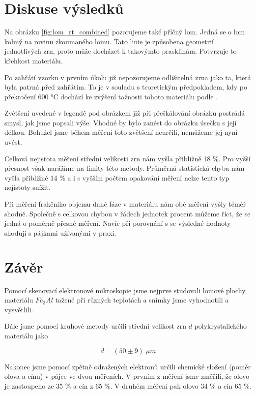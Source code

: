 \section{Diskuse výsledků}
Na obrázku \ref{fig:lom_rt_combined} pozorujeme také příčný lom. Jedná se o lom kolmý na rovinu zkoumaného lomu. Tato linie je způsobena geometrií jednotlivých zrn, proto může docházet k takovýmto prasklinám. Potvrzuje to křehkost materiálu.

Po zahřátí vzorku v prvním úkolu již nepozorujeme odlišitelná zrna jako ta, která byla patrná před zahřátím. To je v souladu s teoretickým předpokladem, kdy po překročení 600 °C dochází ke zvýšení tažnosti tohoto materiálu podle \cite{bib:studijni-text}.

Zvětšení uvedené v legendě pod obrázkem již při přeškálování obrázku postrádá smysl, jak jsme popsali výše. Vhodné by bylo zanést do obrázku úsečku s její délkou. Bohužel jsme během měření toto zvětšení neurčili, nemůžeme jej nyní uvést.

Celková nejistota měření střední velikosti zrn nám vyšla přibližně 18 \%. Pro vyšší přesnost však narážíme na limity této metody. Průměrná statistická chyba nám vyšla přibližně 14 \% a i s vyšším počtem opakování měření nelze tento typ nejistoty snížit. 

Při měření frakčního objemu dané fáze v materiálu nám obě měření vyšly téměř shodně. Společně s celkovou chybou v řádech jednotek procent můžeme říct, že se jedná o poměrně přesné měření. Navíc při porovnání s \cite{bib:pajka} se výsledné hodnoty shodují s pájkami užívanými v praxi.

\section{Závěr}

Pomocí skenovací elektronové mikroskopie jsme nejprve studovali lomové plochy materiálu $Fe_3Al$ tažené při různých teplotách a snímky jsme vyhodnotili a vysvětlili.

Dále jsme pomocí kruhové metody určili střední velikost zrn $d$ polykrystalického materiálu jako

\begin{equation}
    \nonumber
    d = (50 \pm 9) \; \mu m
\end{equation}

Nakonec jsme pomocí zpětně odražených elektronů určili chemické složení (poměr olova a cínu) v pájce ve dvou měřeních. V prvním z měření jsme změřili, že olovo je zastoupeno ze 35 \% a cín z 65 \%. V druhém měření pak olovo 34 \% a cín 65 \%.